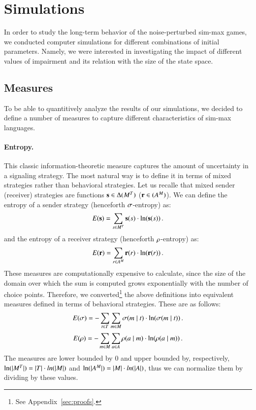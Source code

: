 \section{Simulations}

In order to study the long-term behavior of the noise-perturbed sim-max games, we conducted computer simulations for different combinations of initial parameters.
Namely, we were interested in investigating the impact of different values of impairment and its relation with the size of the state space.

\subsection{Measures}
To be able to quantitively analyze the results of our simulations, we decided to define a number of measures to capture different characteristics of sim-max languages.

\paragraph{Entropy.}
This classic information-theoretic measure captures the amount of uncertainty in a signaling strategy.
The most natural way is to define it in terms of mixed strategies rather than behavioral strategies.
Let us recalle that mixed sender (receiver) strategies are functions $\mathrm{\mathbf{s}} \in \Delta(M^T)$ ($\mathrm{\mathbf{r}} \in (A^M)$).
We can define the entropy of a sender strategy (henceforth $\sigma$-entropy) as:
\begin{align*}
  E(\mathrm{\mathbf{s}}) = \sum_{s \in M^T} \mathrm{\mathbf{s}}(s) \cdot \ln(\mathrm{\mathbf{s}}(s)) \,.
\end{align*} 
and the entropy of a receiver strategy (henceforth $\rho$-entropy) as:
\begin{align*}
  E(\mathrm{\mathbf{r}}) = \sum_{r \in A^M} \mathrm{\mathbf{r}}(r) \cdot \ln(\mathrm{\mathbf{r}}(r)) \,.
\end{align*} 
These measures are computationally expensive to calculate, since the size of the domain over which the sum is computed grows exponentially with the number of choice points.
Therefore, we converted\footnote{See Appendix~\ref{sec:proofs}.} the above definitions into equivalent measures defined in terms of behavioral strategies.
These are as follows:
\begin{align*}
  E(\sigma) = -\sum_{t \in T} \sum_{m \in M} \sigma(m \mid t) \cdot \ln(\sigma(m \mid t)) \,.
\end{align*} 
\begin{align*}
  E(\rho) = -\sum_{m \in M} \sum_{a \in A} \rho(a \mid m) \cdot \ln(\rho(a \mid m)) \,.
\end{align*}
The measures are lower bounded by $0$ and upper bounded by, respectively, $\ln(|M^T|) = |T| \cdot ln(|M|)$ and $\ln(|A^M|) = |M| \cdot ln(|A|)$, thus we can normalize them by dividing by these values.




